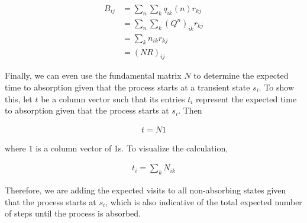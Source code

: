 \documentclass[a4paper,12pt]{article}
\theoremstyle{definition}
\begin{document}
	\begin{equation*}
		\begin{aligned}
		 B_{ij} &= \sum_{n} \sum_{k} q_{ik}(n)r_{kj} \\
		 		&= \sum_{n} \sum_{k} (Q^n)_{ik} r_{kj} \\
		 		&= \sum_{k} n_{ik}r_{kj} \\
		 		&= (NR)_{ij}
		\end{aligned}
	\end{equation*}

	Finally, we can even use the fundamental matrix $N$ to determine the expected time to absorption given that the process starts at a 
	transient state $s_i$. To show this, let $t$ be a column vector such that its entries $t_i$ represent the expected time to 
	absorption given that the process starts at $s_i$. Then

	\begin{equation*}
	\begin{aligned}
		 t = N1
	\end{aligned}
	\end{equation*}
	
	where $1$ is a column vector of 1s. To visualize the calculation,

	\begin{equation*}
		\begin{aligned}
		 t_i = \sum_{k} N_{ik}
		\end{aligned}
	\end{equation*}
	
	Therefore, we are adding the expected visits to all non-absorbing states given that the process starts at $s_i$, which 
	is also indicative of the total expected number of steps until the process is absorbed.
\end{document}
